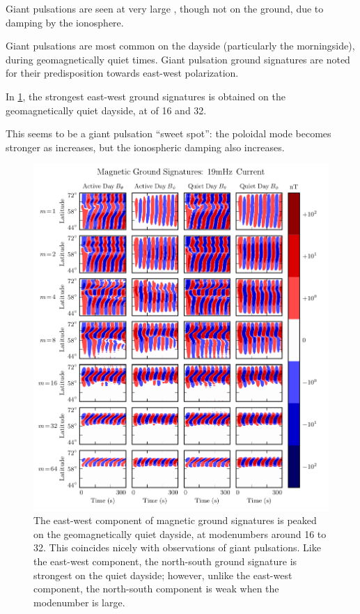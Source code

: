 

Giant pulsations are seen at very large \azm, though not on the ground\cite{takahashi_2013}, due to damping by the ionosphere. 

Giant pulsations are most common on the dayside (particularly the morningside), during geomagnetically quiet times. Giant pulsation ground signatures are noted for their predisposition towards east-west polarization. 

In \cref{fig_ground_signatures}, the strongest east-west ground signatures is obtained on the geomagnetically quiet dayside, at \azm of 16 and 32. 

This seems to be a giant pulsation ``sweet spot'': the poloidal mode becomes stronger as \azm increases, but the ionospheric damping also increases. 

\begin{figure}[H]
    \centering
    \includegraphics[width=\textwidth]{figures/ground_19mHz.pdf}
    \caption[Dayside Ground Magnetic Fields]{
      The east-west component of magnetic ground signatures is peaked on the geomagnetically quiet dayside, at modenumbers around 16 to 32. This coincides nicely with observations of giant pulsations. Like the east-west component, the north-south ground signature is strongest on the quiet dayside; however, unlike the east-west component, the north-south component is weak when the modenumber is large. 
    }
    \label{fig_ground_signatures}
\end{figure}

